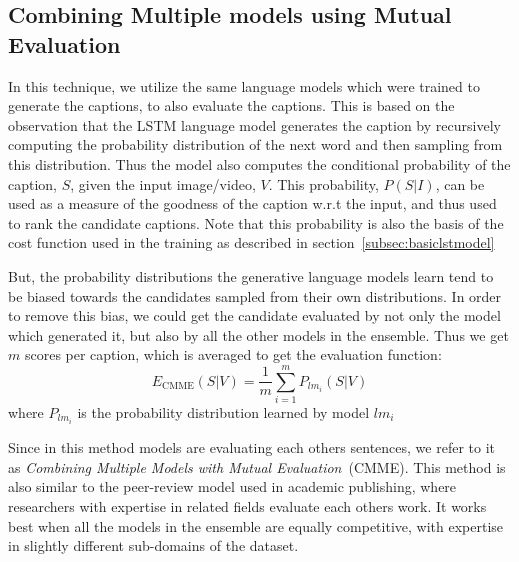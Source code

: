 \subsection{Combining Multiple models using Mutual Evaluation}

In this technique, we utilize the same language models which were trained to generate
the captions, to also evaluate the captions.
This is based on the observation that the LSTM language model generates the
caption by recursively computing the probability distribution of the next word
and then sampling from this distribution.
Thus the model also computes the conditional probability of the caption, $S$,
given the input image/video, $V$.
This probability, $P(S|I)$, can be used as a measure of the goodness of the
caption w.r.t the input, and thus used to rank the candidate captions.
Note that this probability is also the basis of the cost function used in the
training as described in section~\ref{subsec:basiclstmodel}

But, the probability distributions the generative language models learn tend to
be biased towards the candidates sampled from their own distributions.
In order to remove this bias, we could get the candidate evaluated by not only
the model which generated it, but also by all the other models in the ensemble.
Thus we get $m$ scores per caption, which is averaged to get the evaluation
function:
\begin{equation}
  \label{eq:cmme} 
  E_{\text{CMME}}(S|V) = \frac{1}{m}\sum_{i=1}^{m} P_{lm_i}(S | V)
\end{equation}
\noindent where $P_{lm_i}$ is the probability distribution learned by model
$lm_i$

Since in this method models are evaluating each others sentences, we refer to it
as \emph{Combining Multiple Models with Mutual Evaluation}~(CMME).
This method is also similar to the peer-review model used in academic
publishing, where researchers with expertise in related fields evaluate each
others work.
It works best when all the models in the ensemble are equally competitive, with
expertise in slightly different sub-domains of the dataset.

